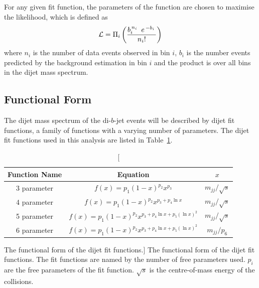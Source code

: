 For any given fit function, the parameters of the function are chosen to maximise the likelihood,
which is defined as
\begin{equation}
  \large {\ensuremath{\mathcal{L}}=  \Pi_i \left(  \frac{b_i^{\,n_i\,}~e^{\,-b_i\,}}{n_i!} \right)}
  \label{eqn:bkg-like}
\end{equation}
where $n_i$ is the number of data events observed in bin $i$,
$b_i$ is the number events predicted by the background estimation in bin $i$
and the product is over all bins in the dijet mass spectrum.

\vfill
\subsection{Functional Form}
\label{sec:bkg-func}



The dijet mass spectrum of the di-$b$-jet events will be described by dijet fit functions,
a family of functions with a varying number of parameters.
The dijet fit functions used in this analysis are listed in Table~\ref{tab:bkg-fit}.

{\renewcommand{\arraystretch}{1.3}
\begin{table}[!thb]
\centering
\begin{tabular}{|c||c|c|}
  \hline
  \textbf{Function Name} & \textbf{Equation}                        & \textbf{$x$} \\
  \hline
  3 parameter   & $f(x)=p_1(1-x)^{p_2}x^{p_3}$                        & $m_{jj}/\sqrt{s}$ \\
  4 parameter   & $f(x)=p_1(1-x)^{p_2}x^{p_3+p_4\ln{x}}$               & $m_{jj}/\sqrt{s}$\\
  5 parameter   & $f(x)=p_1(1-x)^{p_2}x^{p_3+p_4\ln{x}+p_5(\ln{x})^{2}}$  & $m_{jj}/\sqrt{s}$\\ 
  6 parameter   & $f(x)=p_1(1-x)^{p_2}x^{p_3+p_4\ln{x}+p_5(\ln{x})^{2}}$  &  $m_{jj}/p_6$\\ 
  \hline
\end{tabular}
\caption
    [The functional form of the dijet fit functions.]
    {The functional form of the dijet fit functions.
      The fit functions are named by the number of free parameters used. $p_{i}$ are the free parameters of the fit function.
      $\sqrt{s}$ is the centre-of-mass energy of the collisions.}
\label{tab:bkg-fit}
\end{table}}

